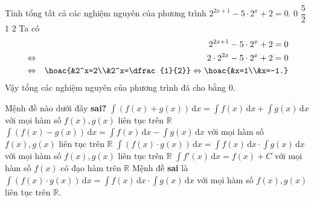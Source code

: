 \begin{ex}%
	Tính tổng tất cả các nghiệm nguyên của phương trình $2^{2x+1}-5\cdot2^x+2=0$.
	\choice
	{\True $0$}
	{$\dfrac{5}{2}$}
	{$1$}
	{$2$}
	\loigiai
	{
		Ta có 
		\begin{eqnarray*}
			& & 2^{2x+1}-5\cdot2^x+2=0\\
			& \Leftrightarrow & 2\cdot 2^{2x}-5\cdot2^x+2=0 \\
			& \Leftrightarrow & \hoac{&2^x=2\\&2^x=\dfrac{1}{2}} \Leftrightarrow  \hoac{&x=1\\&x=-1.}
		\end{eqnarray*}
	Vậy tổng các nghiệm nguyên của phương trình đã cho bằng $0$.
	}
\end{ex}

\begin{ex}%
	Mệnh đề nào dưới đây \textbf{sai?}
	\choice
	{$\displaystyle\int\left(f(x)+g(x)\right)\mathrm{\,d}x=\displaystyle\int f(x)\mathrm{\,d}x+\displaystyle\int g(x)\mathrm{\,d}x$ với mọi hàm số $f(x),g(x)$ liên tục trên $\mathbb{R}$}
	{$\displaystyle\int\left(f(x)-g(x)\right)\mathrm{\,d}x=\displaystyle\int f(x)\mathrm{\,d}x-\displaystyle\int g(x)\mathrm{\,d}x$ với mọi hàm số $f(x),g(x)$ liên tục trên $\mathbb{R}$}
	{\True $\displaystyle\int\left(f(x)\cdot g(x)\right)\mathrm{\,d}x=\displaystyle\int f(x)\mathrm{\,d}x\cdot\displaystyle\int g(x)\mathrm{\,d}x$ với mọi hàm số $f(x),g(x)$ liên tục trên $\mathbb{R}$}
	{$\displaystyle\int f'(x)\mathrm{\,d}x=f(x)+C$ với mọi hàm số $f(x)$ có đạo hàm trên $\mathbb{R}$}
	\loigiai
	{
		Mệnh đề \textbf{sai} là $\displaystyle\int\left(f(x)\cdot g(x)\right)\mathrm{\,d}x=\displaystyle\int f(x)\mathrm{\,d}x\cdot\displaystyle\int g(x)\mathrm{\,d}x$ với mọi hàm số $f(x),g(x)$ liên tục trên $\mathbb{R}$.
	}
\end{ex}

